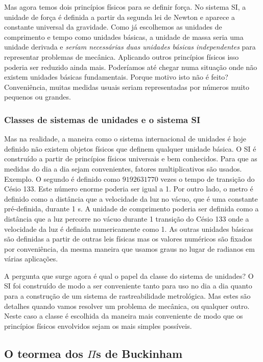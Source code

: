 Mas agora temos dois princípios físicos para se definir força. No sistema SI, a unidade de força é definida a partir da segunda lei de Newton e aparece a constante universal da gravidade. Como já escolhemos as unidades de comprimento e tempo como unidades básicas, a unidade de massa seria uma unidade derivada e \emph{seríam necessárias duas unidades básicas independentes} para representar problemas de mecânica. Aplicando outros princípios físicos isso poderia ser reduzido ainda mais. Poderíamos até chegar numa situação onde não existem unidades básicas fundamentais. Porque motivo isto não é feito? Conveniência, muitas medidas usuais seriam representadas por números muito pequenos ou grandes.

\subsubsection{Classes de sistemas de unidades e o sistema SI}

Mas na realidade, a maneira como o sistema internacional de unidades é hoje definido não existem objetos físicos que definem qualquer unidade básica. O SI é construído a partir de princípios físicos universais e bem conhecidos. Para que as medidas do dia a dia sejam convenientes, fatores multiplicativos são usados. Exemplo. O segundo é definido como $9 192 631 770$ vezes o tempo de transição do Césio 133. Este número enorme poderia ser igual a 1. Por outro lado, o metro é definido como a distância que a velocidade da luz no vácuo, que é uma constante pré-definida, durante 1 s. A unidade de comprimento poderia ser definida como a distância que a luz percorre no vácuo durante 1 transição do Césio 133 onde a velocidade da luz é definida numericamente como 1. As outras unidades básicas são definidas a partir de outras leis físicas mas os valores numéricos são fixados por conveniência, da mesma maneira que usamos graus no lugar de radianos em várias aplicações.

A pergunta que surge agora é qual o papel da classe do sistema de unidades? O SI  foi construído de modo a ser conveniente tanto para uso no dia a dia quanto para a construção de um sistema de rastreabilidade metrológica. Mas estes são detalhes quando vamos resolver um problema de mecânica, ou qualquer outro. Neste caso a classe é escolhida da maneira mais conveniente de modo que os princípios físicos envolvidos sejam os mais simples possíveis. 


\subsection{O teormea dos $\Pi$s de Buckinham}
